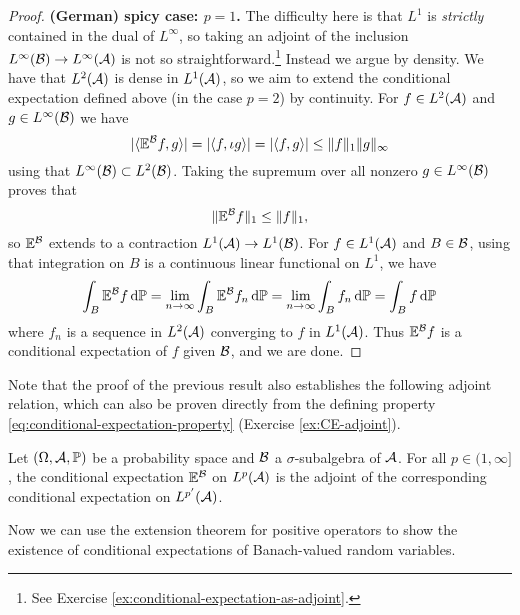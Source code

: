 \begin{proof}
  \textbf{(German) spicy case: $p = 1$.} The difficulty here is that $L^1$ is \emph{strictly} contained in the dual of $L^\infty$, so taking an adjoint of the inclusion $L^\infty(\mathcal{B}) \to L^\infty(\mathcal{A})$ is not so straightforward.\footnote{See Exercise \ref{ex:conditional-expectation-as-adjoint}.} 
  Instead we argue by density.
  We have that $L^2(\mathcal{A})$ is dense in $L^1(\mathcal{A})$, so we aim to extend the conditional expectation defined above (in the case $p=2$) by continuity.
  For $f \in L^2(\mathcal{A})$ and $g \in L^\infty(\mathcal{B})$ we have
  \begin{equation*}
    |\langle \mathbb{E}^{\mathcal{B}} f, g \rangle| = |\langle f, \iota g \rangle| = |\langle f, g \rangle| \leq \|f\|_1 \|g\|_\infty
  \end{equation*}
  using that $L^\infty(\mathcal{B}) \subset L^2(\mathcal{B})$.
  Taking the supremum over all nonzero $g \in L^\infty(\mathcal{B})$ proves that
  \begin{equation*}
    \|\mathbb{E}^{\mathcal{B}} f\|_1 \leq \|f\|_1,
  \end{equation*}
  so $\mathbb{E}^{\mathcal{B}}$ extends to a contraction $L^1(\mathcal{A}) \to L^1(\mathcal{B})$.
  For $f \in L^1(\mathcal{A})$ and $B \in \mathcal{B}$, using that integration on $B$ is a continuous linear functional on $L^1$, we have
  \begin{equation*}
    \int_B \mathbb{E}^{\mathcal{B}} f \, \mathrm{d}\mathbb{P}
    = \lim_{n \to \infty} \int_B \mathbb{E}^{\mathcal{B}} f_n \, \mathrm{d}\mathbb{P}
    = \lim_{n \to \infty} \int_B  f_n \, \mathrm{d}\mathbb{P}
    = \int_B f \, \mathrm{d}\mathbb{P}
  \end{equation*}
  where $f_n$ is a sequence in $L^2(\mathcal{A})$ converging to $f$ in $L^1(\mathcal{A})$.
  Thus $\mathbb{E}^{\mathcal{B}}f$ is a conditional expectation of $f$ given $\mathcal{B}$, and we are done.
\end{proof}

Note that the proof of the previous result also establishes the following adjoint relation, which can also be proven directly from the defining property \eqref{eq:conditional-expectation-property} (Exercise \ref{ex:CE-adjoint}).

\begin{prop}\label{prop:CE-adjoint}
  Let $(\Omega,\mathcal{A},\mathbb{P})$ be a probability space and $\mathcal{B}$ a $\sigma$-subalgebra of $\mathcal{A}$.
  For all $p \in (1,\infty]$, the conditional expectation $\mathbb{E}^{\mathcal{B}}$ on $L^p(\mathcal{A})$ is the adjoint of the corresponding conditional expectation on $L^{p'}(\mathcal{A})$.
\end{prop}

Now we can use the extension theorem for positive operators to show the existence of conditional expectations of Banach-valued random variables.

